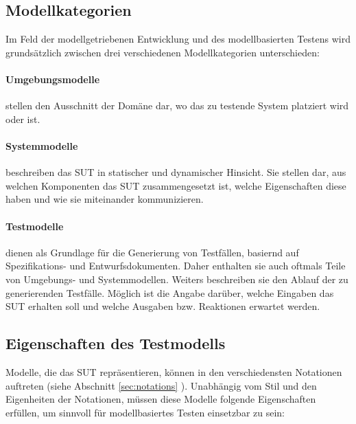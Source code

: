 \subsection{Modellkategorien}
Im Feld der modellgetriebenen Entwicklung und des modellbasierten Testens wird grundsätzlich zwischen drei verschiedenen Modellkategorien unterschieden:

\paragraph{Umgebungsmodelle} stellen den Ausschnitt der Domäne dar, wo das zu testende System platziert wird oder ist.
\paragraph{Systemmodelle} beschreiben das \Gls{SUT} in statischer und dynamischer Hinsicht. Sie stellen dar, aus welchen Komponenten das \Gls{SUT} zusammengesetzt ist, welche Eigenschaften diese haben und wie sie miteinander kommunizieren. 
\paragraph{Testmodelle} dienen als Grundlage für die Generierung von Testfällen, basiernd auf Spezifikations- und Entwurfsdokumenten. Daher enthalten sie auch oftmals Teile von Umgebungs- und Systemmodellen. Weiters beschreiben sie den Ablauf der zu generierenden Testfälle. Möglich ist die Angabe darüber, welche Eingaben das \Gls{SUT} erhalten soll und welche Ausgaben bzw. Reaktionen erwartet werden.

\subsection{Eigenschaften des Testmodells} 
\label{sec:eigenschaften_modell}
Modelle, die das \gls{SUT} repräsentieren, können in den verschiedensten Notationen auftreten (siehe Abschnitt \ref{sec:notations} ). Unabhängig vom Stil und den Eigenheiten der Notationen, müssen diese Modelle folgende Eigenschaften erfüllen, um sinnvoll für modellbasiertes Testen einsetzbar zu sein:\\

